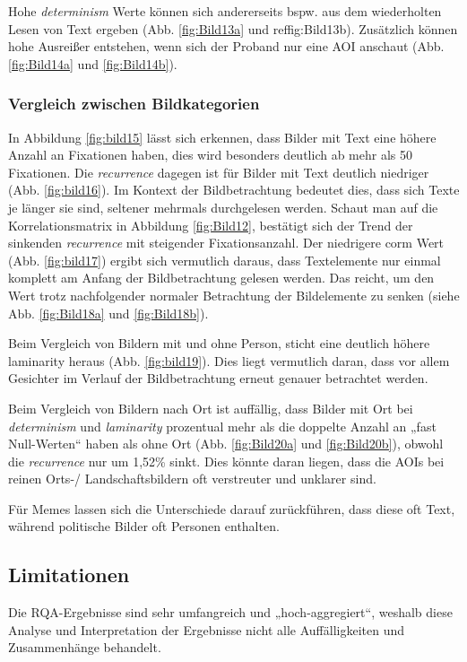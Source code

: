 \documentclass[
    language=german, %
    thesis=seminar, %
    supervisor=postdoc, %
    multiauthor=true, %
    ]{settings/csssa-thesis}
\begin{document}
Hohe \textit{determinism} Werte können sich andererseits bspw. 
aus dem wiederholten Lesen von Text ergeben (Abb. \ref{fig:Bild13a} und ref{fig:Bild13b}). 
Zusätzlich können hohe Ausrei{\ss}er entstehen, wenn sich der Proband nur eine AOI anschaut (Abb. \ref{fig:Bild14a} und \ref{fig:Bild14b}). 

\subsubsection{Vergleich zwischen Bildkategorien}
In Abbildung \ref{fig:bild15} lässt sich erkennen, dass Bilder mit Text eine höhere Anzahl an Fixationen haben, 
dies wird besonders deutlich ab mehr als 50 Fixationen. 
Die \textit{recurrence} dagegen ist für Bilder mit Text deutlich niedriger (Abb. \ref{fig:bild16}). 
Im Kontext der Bildbetrachtung bedeutet dies, dass sich Texte je länger sie sind, 
seltener mehrmals durchgelesen werden.  Schaut man auf die Korrelationsmatrix in Abbildung \ref{fig:Bild12}, 
bestätigt sich der Trend der sinkenden \textit{recurrence} mit steigender Fixationsanzahl. 
Der niedrigere corm Wert (Abb. \ref{fig:bild17}) ergibt sich vermutlich daraus, dass Textelemente 
nur einmal komplett am Anfang der Bildbetrachtung gelesen werden. Das reicht, 
um den Wert trotz nachfolgender normaler Betrachtung der Bildelemente zu senken (siehe Abb. \ref{fig:Bild18a} und \ref{fig:Bild18b}). 

Beim Vergleich von Bildern mit und ohne Person, sticht eine deutlich höhere laminarity heraus (Abb. \ref{fig:bild19}). 
Dies liegt vermutlich daran, dass vor allem Gesichter im Verlauf der Bildbetrachtung erneut genauer betrachtet werden. 

Beim Vergleich von Bildern nach Ort ist auffällig, dass Bilder mit Ort bei \textit{determinism} und \textit{laminarity} 
prozentual mehr als die doppelte Anzahl an „fast Null-Werten“ haben als ohne Ort (Abb. \ref{fig:Bild20a} und \ref{fig:Bild20b}), 
obwohl die \textit{recurrence} nur um 1,52\% sinkt. Dies könnte daran liegen, dass die AOIs bei reinen 
Orts-/ Landschaftsbildern oft verstreuter und unklarer sind. 

Für Memes lassen sich die Unterschiede darauf zurückführen, dass diese oft Text, während politische Bilder oft Personen enthalten.  

\subsection{Limitationen}
Die RQA-Ergebnisse sind sehr umfangreich und „hoch-aggregiert“, weshalb diese Analyse und 
Interpretation der Ergebnisse nicht alle Auffälligkeiten und Zusammenhänge behandelt. 
\end{document}
